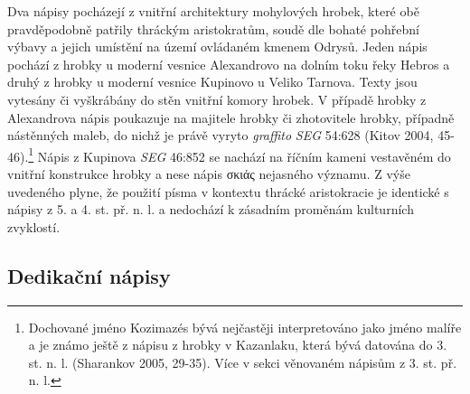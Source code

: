 Dva nápisy pocházejí z vnitřní architektury mohylových hrobek, které obě pravděpodobně patřily thráckým aristokratům, soudě dle bohaté pohřební výbavy a jejich umístění na území ovládaném kmenem Odrysů. Jeden nápis pochází z hrobky u moderní vesnice Alexandrovo na dolním toku řeky Hebros a druhý z hrobky u moderní vesnice Kupinovo u Veliko Tarnova. Texty jsou vytesány či vyškrábány do stěn vnitřní komory hrobek. V případě hrobky z Alexandrova nápis poukazuje na majitele hrobky či zhotovitele hrobky, případně nástěnných maleb, do nichž je právě vyryto {\em graffito} {\em SEG} 54:628 (Kitov 2004, 45-46).\footnote{Dochované jméno Kozimazés bývá nejčastěji interpretováno jako jméno malíře a je známo ještě z nápisu z hrobky v Kazanlaku, která bývá datována do 3. st. n. l. (Sharankov 2005, 29-35). Více v sekci věnovaném nápisům z 3. st. př. n. l.} Nápis z Kupinova {\em SEG} 46:852 se nachází na říčním kameni vestavěném do vnitřní konstrukce hrobky a nese nápis σκιάς nejasného významu. Z výše uvedeného plyne, že použití písma v kontextu thrácké aristokracie je identické s nápisy z 5. a 4. st. př. n. l. a nedochází k zásadním proměnám kulturních zvyklostí.

\subsection[dedikační-nápisy-4]{Dedikační nápisy}

